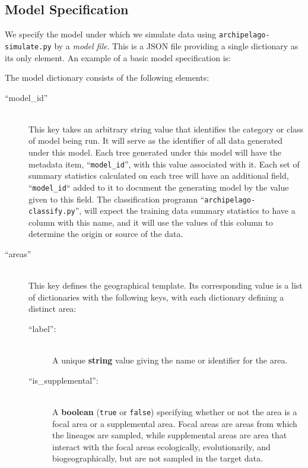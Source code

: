\documentclass[11pt,openany]{memoir} %
\begin{document}
\subsection{Model Specification}
\label{sec:workflow-model-specification}
We specify the model under which we simulate data using \texttt{archipelago-simulate.py} by a \textit{model file}.
This is a JSON file providing a single dictionary as its only element.
An example of a basic model specification is:
% 

The model dictionary consists of the following elements:
\begin{description}

    \item[``model\_id'']  \hfill \\
        This key takes an arbitrary string value that identifies the category or class of model being run.
        It will serve as the identifier of all data generated under this model.
        Each tree generated under this model will have the metadata item, ``\texttt{model\_id}'', with this value associated with it.
        Each set of summary statistics calculated on each tree will have an additional field, ``\texttt{model\_id}`` added to it to document the generating model by the value given to this field.
        The classification programn ``\texttt{archipelago-classify.py}'', will expect the training data summary statistics to have a column with this name, and it will use the values of this column to determine the origin or source of the data.
    \item[``areas'']  \hfill \\
        This key defines the geographical template.
        Its corresponding value is a list of dictionaries with the following keys, with each dictionary defining a distinct area:
        \begin{description}
            \item[``label'':] \hfill \\
                A unique \textbf{string} value giving the name or identifier for the area.
            \item[``is\_supplemental'':] \hfill \\
                A \textbf{boolean} (\texttt{true} or \texttt{false}) specifying whether or not the area is a focal area or a supplemental area.
                Focal areas are areas from which the lineages are sampled, while supplemental areas are area that interact with the focal areas ecologically, evolutionarily, and biogeographically, but are not sampled in the target data.

\end{description}
\end{description}
\end{document}
